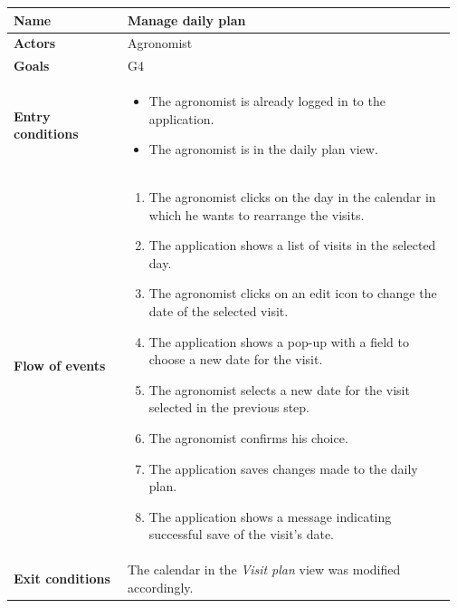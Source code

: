 \begin{longtable}{@{}p{0.25\linewidth} p{0.72\linewidth}@{}}
    \toprule
	\textbf{Name}               & Manage daily plan\\
	\midrule
	\textbf{Actors}             & Agronomist\\
	\midrule
	\textbf{Goals}              & G4 \\
	\midrule
	
	\textbf{Entry conditions}   & \begin{itemize}[leftmargin=.4cm,noitemsep,topsep=0pt,before=\vspace{-3mm},after=\vspace{-4mm}]
	    \item The agronomist is already logged in to the application.
	    \item The agronomist is in the daily plan view.
	\end{itemize}\\
	\midrule
	
	\textbf{Flow of events}     & \begin{enumerate}[leftmargin=.4cm,noitemsep,topsep=0pt,before=\vspace{-3mm},after=\vspace{-4mm}]
	    \item The agronomist clicks on the day in the calendar in which he wants to rearrange the visits.
	    \item The application shows a list of visits in the selected day.
	    \item The agronomist clicks on an edit icon to change the date of the selected visit.
	    \item The application shows a pop-up with a field to choose a new date for the visit.
	    \item The agronomist selects a new date for the visit selected in the previous step.
	    \item The agronomist confirms his choice.
	    \item The application saves changes made to the daily plan.
	    \item The application shows a message indicating successful save of the visit's date.
	\end{enumerate}\\
	\midrule
	\textbf{Exit conditions}    & The calendar in the \textit{Visit plan} view was modified accordingly. \\
	\midrule
	

\end{longtable}
